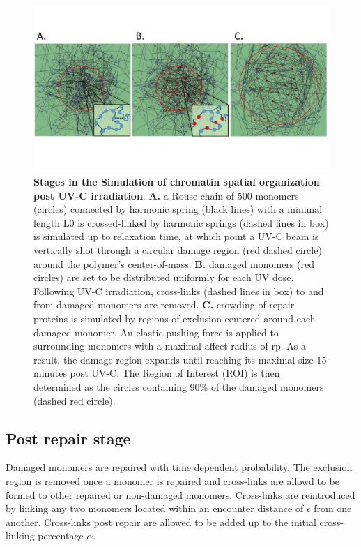 \documentclass[12pt]{article}
\begin{document}
	\begin{figure}[H]
	\includegraphics[width=0.9\linewidth, height=0.35\textheight]{threeStagesOfSimulation}
	\caption{\textbf{Stages in the Simulation of chromatin spatial organization post UV-C irradiation}. \textbf{A.} a Rouse chain of 500 monomers (circles) connected by harmonic spring (black lines) with a minimal length L0 is crossed-linked by harmonic springs (dashed lines in box) is simulated up to relaxation time, at which point a UV-C beam is vertically shot through a circular damage region (red dashed circle) around the polymer’s center-of-mass. \textbf{B.}  damaged monomers (red circles) are set to be distributed uniformly for each UV dose. Following UV-C irradiation, cross-links (dashed lines in box) to and from damaged monomers are removed. \textbf{C.} crowding of repair proteins is simulated by regions of exclusion centered around each damaged monomer. An elastic pushing force is applied to surrounding monomers with a maximal affect radius of rp. As a result, the damage region expands until reaching its maximal size 15 minutes post UV-C. The Region of Interest (ROI) is then determined as the circles containing 90\% of the damaged monomers (dashed red circle).}
	\label{fig:threeStagesOfSimulation}
	\end{figure}
	
	\subsection{Post repair stage}
	Damaged monomers are repaired with time dependent probability. The exclusion region is removed once a monomer is repaired and cross-links are allowd to be formed to other repaired or non-damaged monomers.  Cross-links are reintroduced by linking any two monomers located within an encounter distance of $\epsilon$ from one another. Cross-links post repair are allowed to be added up to the initial cross-linking percentage $\alpha$.
	
\end{document}
